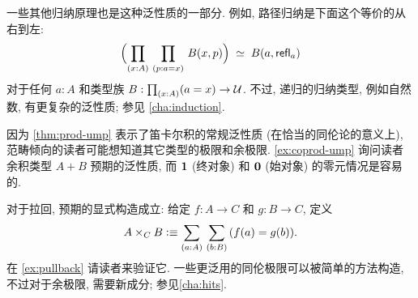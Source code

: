 一些其他归纳原理也是这种泛性质的一部分.
例如, 路径归纳是下面这个等价的从右到左:
%
%
\begin{equation}
  \label{eq:path-lump}
  \eqvspaced{\Parens{\prd{x:A}{p:a=x} B(x,p)}}{B(a,\refl a)}
\end{equation}
对于任何 $a:A$ 和类型族 $B:\prd{x:A} (a=x) \to\type$.
不过, 递归的归纳类型, 例如自然数, 有更复杂的泛性质; 参见 \cref{cha:induction}.

%
%
%
%
因为 \cref{thm:prod-ump} 表示了笛卡尔积的常规泛性质 (在恰当的同伦论的意义上), 范畴倾向的读者可能想知道其它类型的极限和余极限.
\cref{ex:coprod-ump} 询问读者余积类型 $A+B$ 预期的泛性质, 而 $\mathbf{1}$ (终对象) 和 $\mathbf{0}$ (始对象) 的零元情况是容易的.
%
%
%
%

%
对于拉回, 预期的显式构造成立: 给定 $f:A\to C$ 和 $g:B\to C$, 定义
\begin{equation}
  A\times_C B \defeq \sm{a:A}{b:B} (f(a)=g(b)).\label{eq:defn-pullback}
\end{equation}
在 \cref{ex:pullback} 请读者来验证它.
一些更泛用的同伦极限可以被简单的方法构造, 不过对于余极限, 需要新成分; 参见\cref{cha:hits}.

%